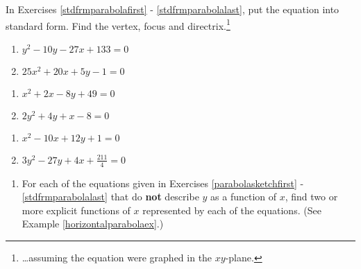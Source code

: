 In Exercises \ref{stdfrmparabolafirst} - \ref{stdfrmparabolalast}, put the equation into standard form.  Find the vertex, focus and directrix.\footnote{\ldots assuming the equation were graphed in the $xy$-plane.}

\begin{multicols}{2}
\begin{enumerate}
\setcounter{enumi}{\value{HW}}

\item  \label{paranotfcnfive} $y^{2} - 10y - 27x + 133 = 0$ \label{stdfrmparabolafirst}
\item $25x^{2} + 20x + 5y - 1 = 0$

\setcounter{HW}{\value{enumi}}
\end{enumerate}
\end{multicols}

\begin{multicols}{2}
\begin{enumerate}
\setcounter{enumi}{\value{HW}}

\item $x^2 + 2x - 8y + 49 = 0$
\item  \label{paranotfcnsix} $2y^2 + 4y +x - 8 = 0$

\setcounter{HW}{\value{enumi}}
\end{enumerate}
\end{multicols}

\begin{multicols}{2}
\begin{enumerate}
\setcounter{enumi}{\value{HW}}

\item $x^2-10x+12y+1=0$
\item   $3y^2-27y+4x+\frac{211}{4} = 0$ \label{stdfrmparabolalast}   \label{paranotfcnseven} 

\setcounter{HW}{\value{enumi}}
\end{enumerate}
\end{multicols}

\begin{enumerate}
\setcounter{enumi}{\value{HW}}


\item For each of the equations given in Exercises \ref{parabolasketchfirst} - \ref{stdfrmparabolalast} that do \textbf{not} describe $y$ as a function of $x$, find two or more explicit functions of $x$ represented by each of the equations.  (See Example \ref{horizontalparabolaex}.)


\setcounter{HW}{\value{enumi}}
\end{enumerate}

